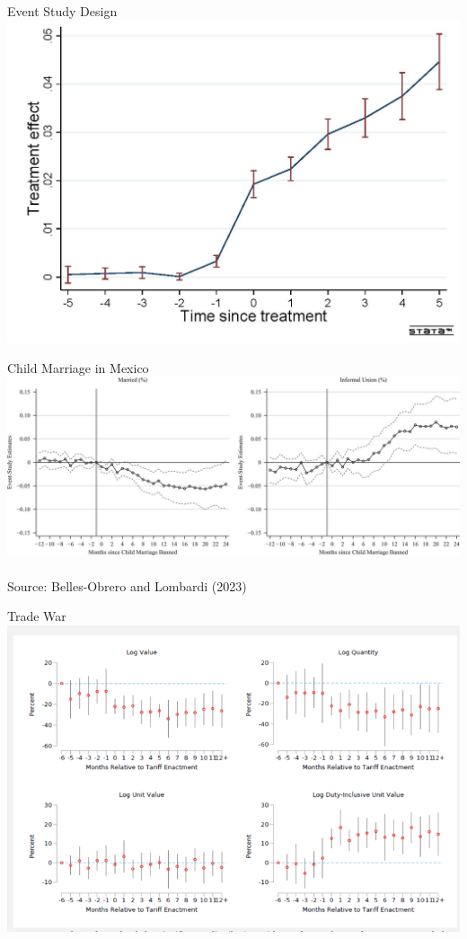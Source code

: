 \documentclass{./../div_teaching_slides}
\begin{document}
\begin{frame}{Event Study Design}
\centering
\includegraphics[scale=0.75]{event_study.jpeg}
\end{frame}

\begin{frame}{Child Marriage in Mexico}
\centering
\includegraphics[scale=1.25]{eg1.jpg} \\~\\
Source: Belles-Obrero and Lombardi (2023)
\end{frame}

\begin{frame}{Trade War}
\centering
\includegraphics[scale=0.4]{eg2_1.png}
\end{frame}
\end{document}
